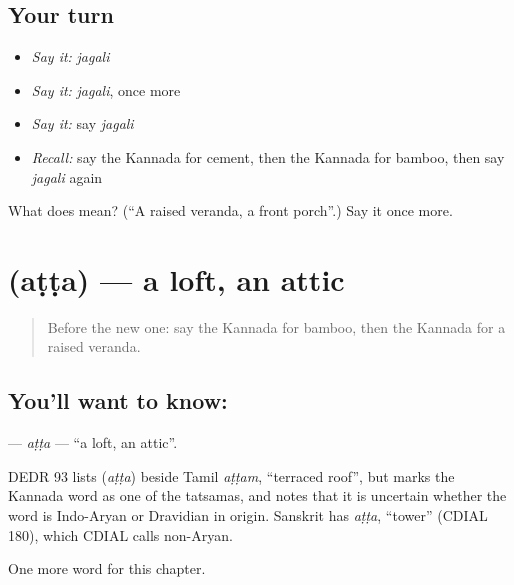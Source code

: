 \subsection*{Your turn}
\begin{itemize}
\raggedright
  \item \emph{Say it:} \emph{jagali}
  \item \emph{Say it:} \emph{jagali}, once more
  \item \emph{Say it:} say \emph{jagali}
  \item \emph{Recall:} say the Kannada for cement, then the Kannada for bamboo, then say \emph{jagali} again
\end{itemize}

\begin{tcolorbox}[breakable,colback=teal!4,colframe=teal!35!black,title={Before you move on}]
What does  mean? (\textquotedblleft{}A raised veranda, a front porch\textquotedblright{}.) Say it once more.
\end{tcolorbox}
\section[\texorpdfstring{\kn{ಅಟ್ಟ} (aṭṭa)}{ಅಟ್ಟ (aṭṭa)}]{ (aṭṭa) — a loft, an attic}

\label{lesson:KA-C303-atta}



\begin{quote}
Before the new one: say the Kannada for bamboo, then the Kannada for a raised veranda.
\end{quote}

\subsection*{You'll want to know: }
\textbf{} — \emph{aṭṭa} — \textquotedblleft{}a loft, an attic\textquotedblright{}.

\begin{cousinweb}
DEDR 93 lists \textbf{} (\emph{aṭṭa}) beside Tamil \emph{aṭṭam}, \textquotedblleft{}terraced roof\textquotedblright{}, but marks the Kannada word as one of the tatsamas, and notes that it is uncertain whether the word is Indo-Aryan or Dravidian in origin. Sanskrit has \emph{aṭṭa}, \textquotedblleft{}tower\textquotedblright{} (CDIAL 180), which CDIAL calls non-Aryan.
\end{cousinweb}

\begin{grammarlens}[title={What you've built}]
One more word for this chapter.
\end{grammarlens}

